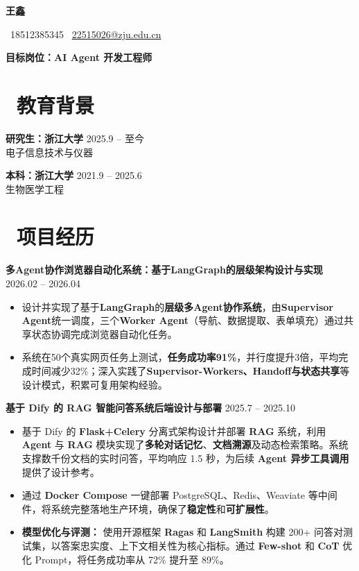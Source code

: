 \documentclass[11pt]{article}
\newlength{\interProjectSpacing}
\newcommand{\projectsep}{\vspace{\interProjectSpacing}}
\newlength{\intraProjectTitleSep}
\newcommand{\titlebreak}{\\[\intraProjectTitleSep]}
\newlength{\intraProjectListTopSep}
\begin{document}

\centerline{\LARGE\bfseries{王鑫}} 

\centerline{\normalsize{\faPhone\ 18512385345 \quad \faEnvelopeO\ \href{mailto:22515026@zju.edu.cn}{22515026@zju.edu.cn}}} 
\centerline{\normalsize{\bfseries{目标岗位：AI Agent 开发工程师}}} 

    
\section{\makebox[\widthof{\faGraduationCap}][c]{\color{CVBlue}\faGraduationCap}\ 教育背景}   
\textbf{研究生：浙江大学} \hfill 2025.9 -- 至今 \\[0.5em]
电子信息技术与仪器\quad  

\textbf{本科：浙江大学} \hfill 2021.9 -- 2025.6 \\[0.5em]
生物医学工程\quad  

\section{\makebox[\widthof{\faUsers}][c]{\color{CVBlue}\faUsers}\ 项目经历}

\textbf{多Agent协作浏览器自动化系统：基于LangGraph的层级架构设计与实现} \hfill 2026.02 -- 2026.04 \titlebreak
\begin{itemize}[nosep, topsep=\intraProjectListTopSep]
    \item 设计并实现了基于\textbf{LangGraph}的\textbf{层级多Agent协作系统}，由\textbf{Supervisor Agent}统一调度，三个\textbf{Worker Agent}（导航、数据提取、表单填充）通过共享状态协调完成浏览器自动化任务。
    \item 系统在50个真实网页任务上测试，\textbf{任务成功率91\%}，并行度提升3倍，平均完成时间减少32\%；深入实践了\textbf{Supervisor-Workers、Handoff与状态共享}等设计模式，积累可复用架构经验。
\end{itemize}

\projectsep

\textbf{基于 Dify 的 RAG 智能问答系统后端设计与部署} \hfill 2025.7 -- 2025.10 \titlebreak
\begin{itemize}[nosep, topsep=\intraProjectListTopSep]
    \item 基于 Dify 的 \textbf{Flask+Celery} 分离式架构设计并部署 \textbf{RAG} 系统，利用 \textbf{Agent} 与 \textbf{RAG} 模块实现了\textbf{多轮对话记忆}、\textbf{文档溯源}及动态检索策略。系统支撑数千份文档的实时问答，平均响应 1.5 秒，为后续 \textbf{Agent 异步工具调用} 提供了设计参考。
    \item 通过 \textbf{Docker Compose} 一键部署 PostgreSQL、Redis、Weaviate 等中间件，将系统完整落地生产环境，确保了\textbf{稳定性}和\textbf{可扩展性}。
    \item \textbf{模型优化与评测：} 使用开源框架 \textbf{Ragas} 和 \textbf{LangSmith} 构建 200+ 问答对测试集，以答案忠实度、上下文相关性为核心指标。通过 \textbf{Few-shot} 和 \textbf{CoT} 优化 Prompt，将任务成功率从 72\% 提升至 89\%。
\end{itemize}
\end{document}
